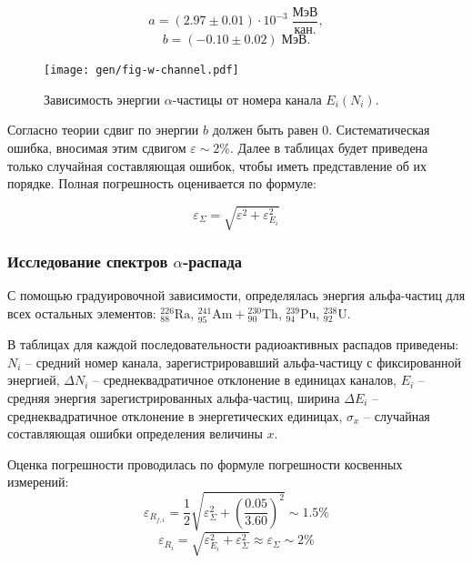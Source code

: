 \documentclass[10pt,a4paper]{article}
\newcommand{\elem}[3]{{}^{#2}_{#3}\text{#1}}
\newcommand{\Ra}{\elem{Ra}{226}{88}}
\newcommand{\Pu}{\elem{Pu}{239}{94}}
\newcommand{\Ua}{\elem{U}{238}{92}}
\newcommand{\Th}{\elem{Th}{230}{90}}
\newcommand{\Am}{\elem{Am}{241}{95}}
\begin{document}
\begin{multicols}{2}
	$$ a = (2.97 \pm 0.01) \cdot 10^{-3} \; \frac{ \text{МэВ} }{ \text{кан.} },$$
	$$ b = (-0.10 \pm 0.02) \; \text{МэВ}.$$
	
	\begin{figure}[H]
		\texttt{[image: gen/fig-w-channel.pdf]}
		\caption{Зависимость энергии $\alpha$-частицы от номера канала $E_i(N_i)$.}
		\label{fig:w-channel}
	\end{figure}
	
	Согласно теории сдвиг по энергии $b$ должен быть равен 0. Систематическая ошибка, вносимая этим сдвигом $\varepsilon \sim 2\%$. Далее в таблицах будет приведена только случайная составляющая ошибок, чтобы иметь представление об их порядке. Полная погрешность оценивается по формуле:
	
	$$\varepsilon_\Sigma = \sqrt{\varepsilon^2 + \varepsilon_{E_i}^2}$$
	
	\subsubsection*{Исследование спектров $\alpha$-распада}
	
	С помощью градуировочной зависимости, определялась энергия альфа-частиц для всех остальных элементов: $\Ra$, $\Am + \Th$, $\Pu$, $\Ua$.
	
	В таблицах для каждой последовательности радиоактивных распадов приведены: $N_i$ -- средний номер канала, зарегистрировавший альфа-частицу с фиксированной энергией, $\Delta N_i$ -- среднеквадратичное отклонение в единицах каналов, $E_i$ -- средняя энергия зарегистрированных альфа-частиц, ширина $\Delta E_i$ -- среднеквадратичное отклонение в энергетических единицах, $\sigma_x$ -- случайная составляющая  ошибки определения величины $x$.
	
	Оценка погрешности проводилась по формуле погрешности косвенных измерений:
	$$ 
	\varepsilon_{R_{f,i}} = \frac{1}{2} \sqrt{\varepsilon_\Sigma^2 + \left(\frac{0.05}{3.60}\right)^2} \sim 1.5 \%
	$$
	$$ 
	\varepsilon_{R_i} = \sqrt{\varepsilon_{E_i}^2 + \varepsilon_{\Sigma}^2} \approx  \varepsilon_{\Sigma} \sim 2 \%
	$$
	

\end{multicols}
\end{document}
